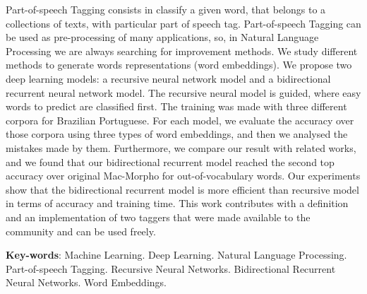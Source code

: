 \begin{resumo}[Abstract]
 
Part-of-speech Tagging consists in classify a given word, that belongs to a collections of texts, with particular part of speech tag. Part-of-speech Tagging can be used as pre-processing of many applications, so, in Natural Language Processing we are always searching for improvement methods. We study different methods to generate words representations (word embeddings). We propose two deep learning models: a recursive neural network model and a bidirectional recurrent neural network model. The recursive neural model is guided, where easy words to predict are classified first. The training was made with three different corpora for Brazilian Portuguese. For each model, we evaluate the accuracy over those corpora using three types of word embeddings, and then we analysed the mistakes made by them. Furthermore, we compare our result with related works, and we found that our bidirectional recurrent model reached the second top accuracy over original Mac-Morpho for out-of-vocabulary words. Our experiments show that the bidirectional recurrent model is more efficient than recursive model in terms of accuracy and training time. This work contributes with a definition and an implementation of two taggers that were made available to the community and can be used freely.

 \vspace{\onelineskip}
 
 \noindent 
 \textbf{Key-words}: Machine Learning. Deep Learning. Natural Language Processing. Part-of-speech Tagging. Recursive Neural Networks. Bidirectional Recurrent Neural Networks. Word Embeddings.
\end{resumo}
